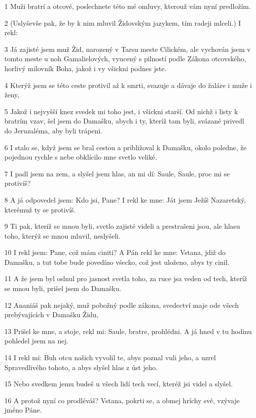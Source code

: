 \par 1 Muži bratrí a otcové, poslechnete této mé omluvy, kterouž vám nyní predložím.
\par 2 (Uslyševše pak, že by k nim mluvil Židovským jazykem, tím radeji mlceli.) I rekl:
\par 3 Já zajisté jsem muž Žid, narozený v Tarsu meste Cilickém, ale vychován jsem v tomto meste u noh Gamalielových, vyucený s pilností podle Zákona otcovského, horlivý milovník Boha, jakož i vy všickni podnes jste.
\par 4 Kterýž jsem se této ceste protivil až k smrti, svazuje a dávaje do žaláre i muže i ženy,
\par 5 Jakož i nejvyšší knez svedek mi toho jest, i všickni starší. Od nichž i listy k bratrím vzav, šel jsem do Damašku, abych i ty, kteríž tam byli, svázané privedl do Jeruzaléma, aby byli trápeni.
\par 6 I stalo se, když jsem se bral cestou a približoval k Damašku, okolo poledne, že pojednou rychle s nebe obklícilo mne svetlo veliké.
\par 7 I padl jsem na zem, a slyšel jsem hlas, an mi dí: Saule, Saule, proc mi se protivíš?
\par 8 A já odpovedel jsem: Kdo jsi, Pane? I rekl ke mne: Ját jsem Ježíš Nazaretský, kterémuž ty se protivíš.
\par 9 Ti pak, kteríž se mnou byli, svetlo zajisté videli a prestrašeni jsou, ale hlasu toho, kterýž se mnou mluvil, neslyšeli.
\par 10 I rekl jsem: Pane, což mám ciniti? A Pán rekl ke mne: Vstana, jdiž do Damašku, a tut tobe bude povedíno všecko, což jest uloženo, abys ty cinil.
\par 11 A že jsem byl oslnul pro jasnost svetla toho, za ruce jsa veden od tech, kteríž se mnou byli, prišel jsem do Damašku.
\par 12 Ananiáš pak nejaký, muž pobožný podle zákona, svedectví maje ode všech prebývajících v Damašku Židu,
\par 13 Prišel ke mne, a stoje, rekl mi: Saule, bratre, prohlédni. A já hned v tu hodinu pohledel jsem na nej.
\par 14 I rekl mi: Buh otcu našich vyvolil te, abys poznal vuli jeho, a uzrel Spravedlivého tohoto, a abys slyšel hlas z úst jeho.
\par 15 Nebo svedkem jemu budeš u všech lidí tech vecí, kteréž jsi videl a slyšel.
\par 16 A protož nyní co prodléváš? Vstana, pokrti se, a obmej hríchy své, vzývaje jméno Páne.

